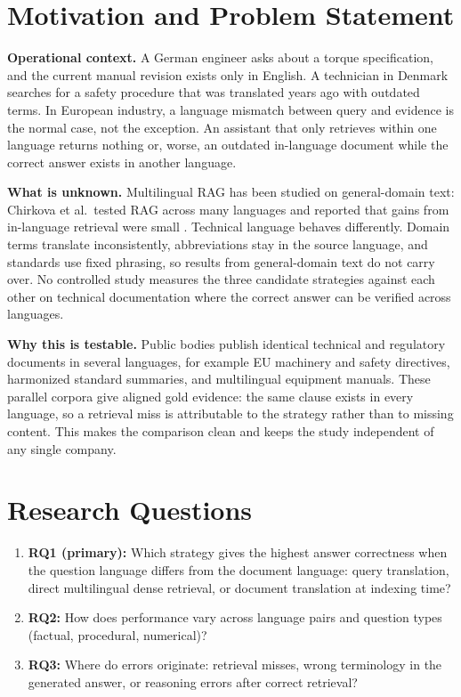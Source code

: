 \documentclass[10pt,a4paper]{article}
\begin{document}
\section{Motivation and Problem Statement}

\textbf{Operational context.} A German engineer asks about a torque specification, and the current manual revision exists only in English. A technician in Denmark searches for a safety procedure that was translated years ago with outdated terms. In European industry, a language mismatch between query and evidence is the normal case, not the exception. An assistant that only retrieves within one language returns nothing or, worse, an outdated in-language document while the correct answer exists in another language.

\textbf{What is unknown.} Multilingual RAG has been studied on general-domain text: Chirkova et al.\ tested RAG across many languages and reported that gains from in-language retrieval were small \cite{chirkova2024}. Technical language behaves differently. Domain terms translate inconsistently, abbreviations stay in the source language, and standards use fixed phrasing, so results from general-domain text do not carry over. No controlled study measures the three candidate strategies against each other on technical documentation where the correct answer can be verified across languages.

\textbf{Why this is testable.} Public bodies publish identical technical and regulatory documents in several languages, for example EU machinery and safety directives, harmonized standard summaries, and multilingual equipment manuals. These parallel corpora give aligned gold evidence: the same clause exists in every language, so a retrieval miss is attributable to the strategy rather than to missing content. This makes the comparison clean and keeps the study independent of any single company.

\section{Research Questions}

\begin{enumerate}
    \item \textbf{RQ1 (primary):} Which strategy gives the highest answer correctness when the question language differs from the document language: query translation, direct multilingual dense retrieval, or document translation at indexing time?
    \item \textbf{RQ2:} How does performance vary across language pairs and question types (factual, procedural, numerical)?
    \item \textbf{RQ3:} Where do errors originate: retrieval misses, wrong terminology in the generated answer, or reasoning errors after correct retrieval?
\end{enumerate}
\end{document}
